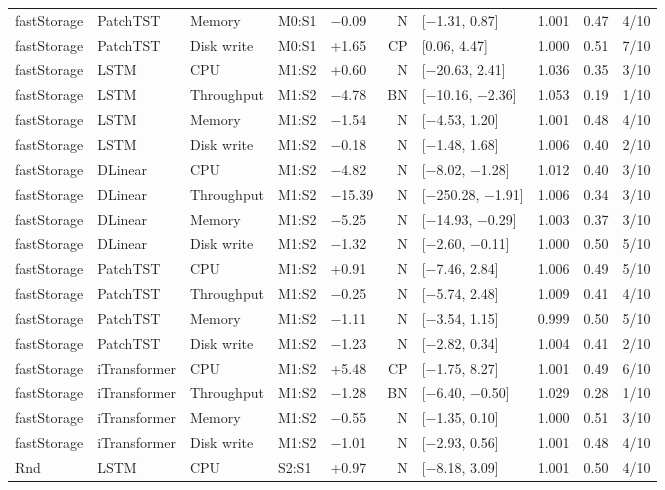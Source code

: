 \documentclass[a4paper,11pt]{article}
\begin{document}
\begin{longtable}{@{}lllllrlrrr@{}}
fastStorage & PatchTST & Memory & M0:S1 & $-$0.09 & N & [$-$1.31, 0.87] & 1.001 & 0.47 & 4/10 \\
fastStorage & PatchTST & Disk write & M0:S1 & +1.65 & CP & [0.06, 4.47] & 1.000 & 0.51 & 7/10 \\
fastStorage & LSTM & CPU & M1:S2 & +0.60 & N & [$-$20.63, 2.41] & 1.036 & 0.35 & 3/10 \\
fastStorage & LSTM & Throughput & M1:S2 & $-$4.78 & BN & [$-$10.16, $-$2.36] & 1.053 & 0.19 & 1/10 \\
fastStorage & LSTM & Memory & M1:S2 & $-$1.54 & N & [$-$4.53, 1.20] & 1.001 & 0.48 & 4/10 \\
fastStorage & LSTM & Disk write & M1:S2 & $-$0.18 & N & [$-$1.48, 1.68] & 1.006 & 0.40 & 2/10 \\
fastStorage & DLinear & CPU & M1:S2 & $-$4.82 & N & [$-$8.02, $-$1.28] & 1.012 & 0.40 & 3/10 \\
fastStorage & DLinear & Throughput & M1:S2 & $-$15.39 & N & [$-$250.28, $-$1.91] & 1.006 & 0.34 & 3/10 \\
fastStorage & DLinear & Memory & M1:S2 & $-$5.25 & N & [$-$14.93, $-$0.29] & 1.003 & 0.37 & 3/10 \\
fastStorage & DLinear & Disk write & M1:S2 & $-$1.32 & N & [$-$2.60, $-$0.11] & 1.000 & 0.50 & 5/10 \\
fastStorage & PatchTST & CPU & M1:S2 & +0.91 & N & [$-$7.46, 2.84] & 1.006 & 0.49 & 5/10 \\
fastStorage & PatchTST & Throughput & M1:S2 & $-$0.25 & N & [$-$5.74, 2.48] & 1.009 & 0.41 & 4/10 \\
fastStorage & PatchTST & Memory & M1:S2 & $-$1.11 & N & [$-$3.54, 1.15] & 0.999 & 0.50 & 5/10 \\
fastStorage & PatchTST & Disk write & M1:S2 & $-$1.23 & N & [$-$2.82, 0.34] & 1.004 & 0.41 & 2/10 \\
fastStorage & iTransformer & CPU & M1:S2 & +5.48 & CP & [$-$1.75, 8.27] & 1.001 & 0.49 & 6/10 \\
fastStorage & iTransformer & Throughput & M1:S2 & $-$1.28 & BN & [$-$6.40, $-$0.50] & 1.029 & 0.28 & 1/10 \\
fastStorage & iTransformer & Memory & M1:S2 & $-$0.55 & N & [$-$1.35, 0.10] & 1.000 & 0.51 & 3/10 \\
fastStorage & iTransformer & Disk write & M1:S2 & $-$1.01 & N & [$-$2.93, 0.56] & 1.001 & 0.48 & 4/10 \\
Rnd & LSTM & CPU & S2:S1 & +0.97 & N & [$-$8.18, 3.09] & 1.001 & 0.50 & 4/10 \\

\end{longtable}
\end{document}
